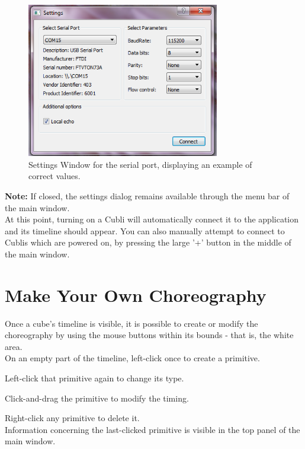\begin{figure}[ht]
   \centering
   \includegraphics[width=0.75\textwidth]{img/SerialSettings.png}
   \caption{Settings Window for the serial port, displaying an example of correct values.}
   \label{img:SerialSettings}
\end{figure}

\textbf{Note:} If closed, the settings dialog remains available through the menu bar of the main window.\\

At this point, turning on a Cubli will automatically connect it to the application and its timeline should appear. You can also manually attempt to connect to Cublis which are powered on, by pressing the large '+' button in the middle of the main window.


\section{Make Your Own Choreography}

Once a cube's timeline is visible, it is possible to create or modify the choreography by using the mouse buttons within its bounds - that is, the white area.\\

On an empty part of the timeline, left-click once to create a primitive.

Left-click that primitive again to change its type.

Click-and-drag the primitive to modify the timing.

Right-click any primitive to delete it.\\

Information concerning the last-clicked primitive is visible in the top panel of the main window.\\

